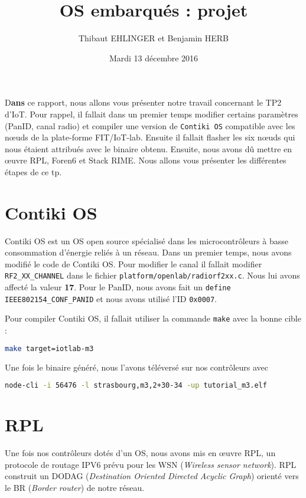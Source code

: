 \documentclass[	DIV=calc,%
							paper=a4,%
							fontsize=11pt,%
			  ]{scrartcl}	 					%
\title{OS embarqués : projet}					%
\author{Thibaut EHLINGER et Benjamin HERB }											%
\date{Mardi 13 décembre 2016}
\newcommand{\initial}[1]{%
     \lettrine[lines=3,lhang=0.3,nindent=0em]{
     				\color{DarkGoldenrod}
     				{\textsf{#1}}}{}}
\begin{document}
\maketitle
\thispagestyle{fancy} 			%

\initial{D}\textbf{ans} ce rapport, nous allons vous présenter notre travail concernant le TP2 d'IoT. Pour rappel, il fallait dans un premier temps modifier  certains paramètres (PanID, canal radio) et compiler une version de \texttt{Contiki OS} compatible avec les nœuds de la plate-forme FIT/IoT-lab. Ensuite il fallait flasher les six nœuds qui nous étaient attribués avec le binaire obtenu. Ensuite, nous avons dû mettre en œuvre RPL, Foren6 et Stack RIME.  Nous allons vous présenter les différentes étapes de ce tp.


\section{Contiki OS}
Contiki OS est un OS open source spécialisé dans les microcontrôleurs à basse consommation d'énergie reliés à un réseau. Dans un premier temps, nous avons modifié le code de Contiki OS. Pour modifier le canal il fallait modifier \texttt{RF2\_XX\_CHANNEL} dans le fichier \texttt{platform/openlab/radiorf2xx.c}. Nous lui avons affecté la valeur \textbf{17}. Pour le PanID, nous avons fait un \texttt{define IEEE802154\_CONF\_PANID} et nous avons utilisé l'ID \texttt{0x0007}.

Pour compiler Contiki OS, il fallait utiliser la commande \texttt{make} avec la bonne cible :
\begin{lstlisting}[language=bash]
make target=iotlab-m3
\end{lstlisting}

Une fois le binaire généré, nous l'avons téléversé sur nos contrôleurs avec 
\begin{lstlisting}[language=bash]
node-cli -i 56476 -l strasbourg,m3,2+30-34 -up tutorial_m3.elf
\end{lstlisting}

\section{RPL}
Une fois nos contrôleurs dotés d'un OS, nous avons mis en œuvre RPL, un protocole de routage IPV6 prévu pour les WSN (\textit{Wireless sensor network}). RPL construit un DODAG (\textit{Destination Oriented Directed Acyclic Graph}) orienté vers le BR (\textit{Border router}) de notre réseau.
\end{document}
